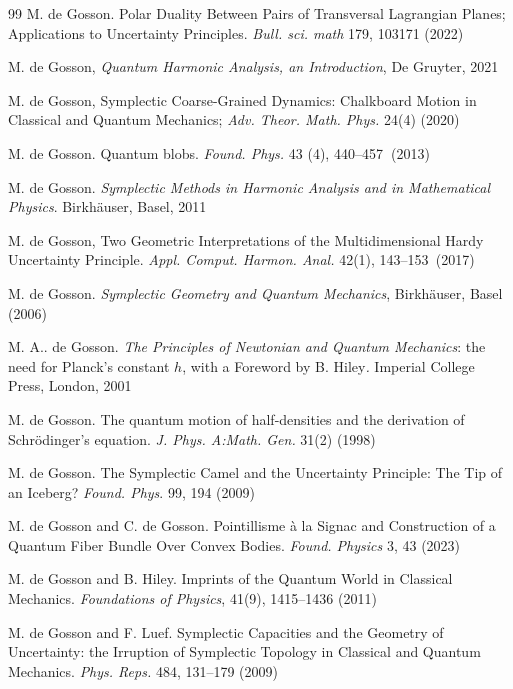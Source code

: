 \documentclass[11pt]{article}%
\begin{document}
\begin{thebibliography}{99}
M. de Gosson. Polar Duality Between Pairs of Transversal
Lagrangian Planes; Applications to Uncertainty Principles.\textit{ Bull. sci.
math} 179, 103171 (2022)

M. de Gosson, \textit{Quantum Harmonic Analysis, an
Introduction}, De Gruyter, 2021

M. de Gosson, Symplectic Coarse-Grained Dynamics: Chalkboard
Motion in Classical and Quantum Mechanics; \textit{Adv. Theor. Math. Phys.}
24(4) (2020)


M. de Gosson. Quantum blobs. \textit{Found. Phys.} 43\textbf{
}(4), 440--457\textbf{\ }(2013)

M. de Gosson. \textit{Symplectic Methods in Harmonic
Analysis and in Mathematical Physics}. Birkh\"{a}user, Basel, 2011

M. de Gosson, Two Geometric Interpretations of the
Multidimensional Hardy Uncertainty Principle. \textit{Appl. Comput. Harmon.
Anal.} 42(1), 143--153\textit{\ }(2017)

M. de Gosson. \textit{Symplectic Geometry and Quantum
Mechanics}, Birkh\"{a}user, Basel (2006)

M. A.. de Gosson. \textit{The Principles of Newtonian and
Quantum Mechanics}: the need for Planck's constant $h$, with a Foreword by B.
Hiley\textit{. }Imperial College Press, London, 2001

M. de Gosson. The quantum motion of half-densities and the
derivation of Schr\"{o}dinger's equation. \textit{J. Phys. A:Math. Gen.} 31(2) (1998)

M. de Gosson. The Symplectic Camel and the Uncertainty
Principle: The Tip of an Iceberg? \textit{Found. Phys}. 99, 194 (2009)

M. de Gosson and C. de Gosson. Pointillisme \`{a} la
Signac and Construction of a Quantum Fiber Bundle Over Convex Bodies.
\textit{Found. Physics} 3, 43 (2023)

M. de Gosson and B. Hiley. Imprints of the Quantum World in
Classical Mechanics. \textit{Foundations of Physics}, 41(9), 1415--1436 (2011)

M. de Gosson and F. Luef. Symplectic Capacities and the
Geometry of Uncertainty: the Irruption of Symplectic Topology in Classical and
Quantum Mechanics. \textit{Phys. Reps.} 484, 131--179 (2009)


\end{thebibliography}
\end{document}
